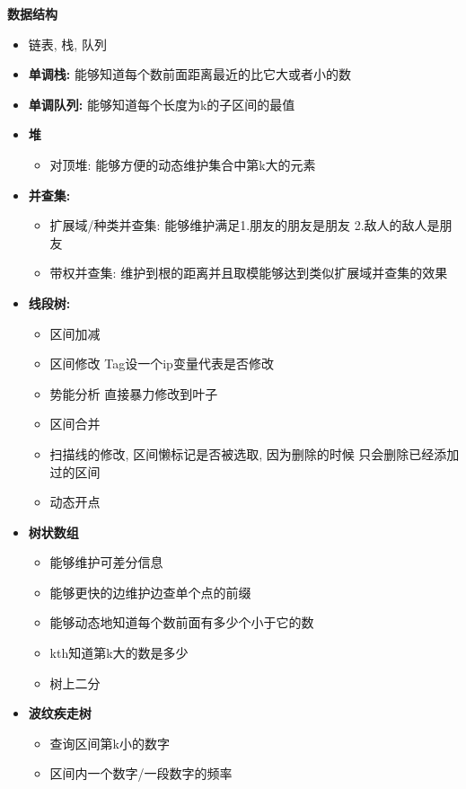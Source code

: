 \textbf{数据结构}

\begin{itemize}
    \item 链表, 栈, 队列
    \item \textbf{单调栈:} 能够知道每个数前面距离最近的比它大或者小的数
    \item \textbf{单调队列:} 能够知道每个长度为k的子区间的最值
    \item \textbf{堆}
    \begin{itemize}
        \item 对顶堆: 能够方便的动态维护集合中第k大的元素
    \end{itemize}
    \item \textbf{并查集:}
    \begin{itemize}
        \item 扩展域/种类并查集: 能够维护满足1.朋友的朋友是朋友 2.敌人的敌人是朋友
        \item 带权并查集: 维护到根的距离并且取模能够达到类似扩展域并查集的效果
    \end{itemize}
    \item \textbf{线段树:}
    \begin{itemize}
        \item 区间加减
        \item 区间修改 Tag设一个ip变量代表是否修改
        \item 势能分析  直接暴力修改到叶子
        \item 区间合并
        \item 扫描线的修改, 区间懒标记是否被选取, 因为删除的时候 只会删除已经添加过的区间
        \item 动态开点
    \end{itemize}
    \item \textbf{树状数组}
    \begin{itemize}
        \item 能够维护可差分信息
        \item 能够更快的边维护边查单个点的前缀
        \item 能够动态地知道每个数前面有多少个小于它的数
        \item kth知道第k大的数是多少
        \item 树上二分
    \end{itemize}
    \item \textbf{波纹疾走树}
    \begin{itemize}
        \item 查询区间第k小的数字
        \item 区间内一个数字/一段数字的频率
    \end{itemize}
\end{itemize}
